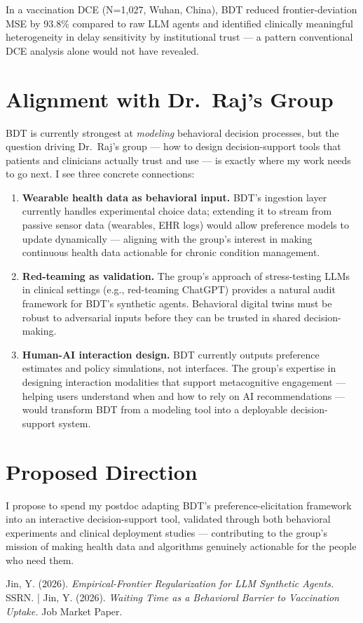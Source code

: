 \documentclass[11pt,a4paper]{article}
\begin{document}
In a vaccination DCE (N=1,027, Wuhan, China), BDT reduced frontier-deviation MSE by 93.8\% compared to raw LLM agents and identified clinically meaningful heterogeneity in delay sensitivity by institutional trust --- a pattern conventional DCE analysis alone would not have revealed.

\section*{Alignment with Dr.~Raj's Group}

BDT is currently strongest at \emph{modeling} behavioral decision processes, but the question driving Dr.~Raj's group --- how to design decision-support tools that patients and clinicians actually trust and use --- is exactly where my work needs to go next. I see three concrete connections:

\begin{enumerate}[leftmargin=*, nosep]
    \item \textbf{Wearable health data as behavioral input.} BDT's ingestion layer currently handles experimental choice data; extending it to stream from passive sensor data (wearables, EHR logs) would allow preference models to update dynamically --- aligning with the group's interest in making continuous health data actionable for chronic condition management.
    \item \textbf{Red-teaming as validation.} The group's approach of stress-testing LLMs in clinical settings (e.g., red-teaming ChatGPT) provides a natural audit framework for BDT's synthetic agents. Behavioral digital twins must be robust to adversarial inputs before they can be trusted in shared decision-making.
    \item \textbf{Human-AI interaction design.} BDT currently outputs preference estimates and policy simulations, not interfaces. The group's expertise in designing interaction modalities that support metacognitive engagement --- helping users understand when and how to rely on AI recommendations --- would transform BDT from a modeling tool into a deployable decision-support system.
\end{enumerate}

\section*{Proposed Direction}

I propose to spend my postdoc adapting BDT's preference-elicitation framework into an interactive decision-support tool, validated through both behavioral experiments and clinical deployment studies --- contributing to the group's mission of making health data and algorithms genuinely actionable for the people who need them.

\vfill
{} {\small Jin, Y. (2026). \emph{Empirical-Frontier Regularization for LLM Synthetic Agents.} SSRN. \;|\; Jin, Y. (2026). \emph{Waiting Time as a Behavioral Barrier to Vaccination Uptake.} Job Market Paper.}
\end{document}
